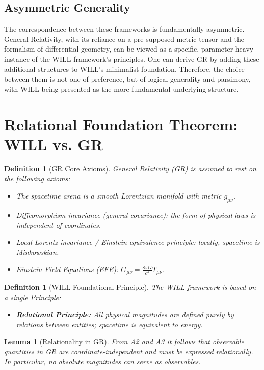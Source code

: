 \documentclass[12pt, a4paper]{article}
\newtheorem{lemma}[theorem]{Lemma}
\newtheorem{definition}[theorem]{Definition}
\begin{document}
\subsection{Asymmetric Generality}
The correspondence between these frameworks is fundamentally asymmetric. General Relativity, with its reliance on a pre-supposed metric tensor and the formalism of differential geometry, can be viewed as a specific, parameter-heavy instance of the WILL framework's principles. One can derive GR by adding these additional structures to WILL's minimalist foundation. Therefore, the choice between them is not one of preference, but of logical generality and parsimony, with WILL being presented as the more fundamental underlying structure.

\section{Relational Foundation Theorem: WILL vs. GR}

\begin{definition}[GR Core Axioms]
General Relativity (GR) is assumed to rest on the following axioms:
\begin{itemize}
    \item[(A1)] The spacetime arena is a smooth Lorentzian manifold with metric $g_{\mu\nu}$.
    \item[(A2)] Diffeomorphism invariance (general covariance): the form of physical laws is independent of coordinates.
    \item[(A3)] Local Lorentz invariance / Einstein equivalence principle: locally, spacetime is Minkowskian.
    \item[(A4)] Einstein Field Equations (EFE): $G_{\mu\nu} = \frac{8\pi G}{c^4} T_{\mu\nu}$.
\end{itemize}
\end{definition}

\begin{definition}[WILL Foundational Principle]
The WILL framework is based on a single Principle:
\begin{itemize}
    \item[(W1)] \textbf{Relational Principle:} All physical magnitudes are defined purely by relations between entities; spacetime is equivalent to energy.
\end{itemize}
\end{definition}

\begin{lemma}[Relationality in GR]
From A2 and A3 it follows that observable quantities in GR are coordinate-independent
and must be expressed relationally. In particular, no absolute magnitudes can serve
as observables.
\end{lemma}
\end{document}

